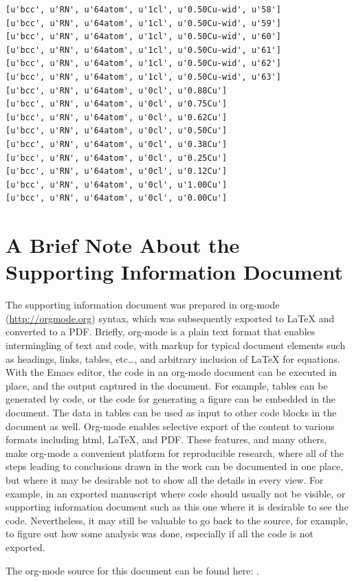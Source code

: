 \documentclass[number, sort&compress, review, 12pt]{elsarticle}
\begin{document}
\begin{verbatim}
[u'bcc', u'RN', u'64atom', u'1cl', u'0.50Cu-wid', u'58']
[u'bcc', u'RN', u'64atom', u'1cl', u'0.50Cu-wid', u'59']
[u'bcc', u'RN', u'64atom', u'1cl', u'0.50Cu-wid', u'60']
[u'bcc', u'RN', u'64atom', u'1cl', u'0.50Cu-wid', u'61']
[u'bcc', u'RN', u'64atom', u'1cl', u'0.50Cu-wid', u'62']
[u'bcc', u'RN', u'64atom', u'1cl', u'0.50Cu-wid', u'63']
[u'bcc', u'RN', u'64atom', u'0cl', u'0.88Cu']
[u'bcc', u'RN', u'64atom', u'0cl', u'0.75Cu']
[u'bcc', u'RN', u'64atom', u'0cl', u'0.62Cu']
[u'bcc', u'RN', u'64atom', u'0cl', u'0.50Cu']
[u'bcc', u'RN', u'64atom', u'0cl', u'0.38Cu']
[u'bcc', u'RN', u'64atom', u'0cl', u'0.25Cu']
[u'bcc', u'RN', u'64atom', u'0cl', u'0.12Cu']
[u'bcc', u'RN', u'64atom', u'0cl', u'1.00Cu']
[u'bcc', u'RN', u'64atom', u'0cl', u'0.00Cu']
\end{verbatim}

\section{A Brief Note About the Supporting Information Document}
\label{sec-2}
The supporting information document was prepared in org-mode (\url{http://orgmode.org}) syntax, which was subsequently exported to \LaTeX{} and converted to a PDF. Briefly, org-mode is a plain text format that enables intermingling of text and code, with markup for typical document elements such as headings, links, tables, etc\ldots{}, and arbitrary inclusion of \LaTeX{} for equations. With the Emacs editor, the code in an org-mode document can be executed in place, and the output captured in the document. For example, tables can be generated by code, or the code for generating a figure can be embedded in the document. The data in tables can be used as input to other code blocks in the document as well. Org-mode enables selective export of the content to various formats including html, \LaTeX{}, and PDF. These features, and many others, make org-mode a convenient platform for reproducible research, where all of the steps leading to conclusions drawn in the work can be documented in one place, but where it may be desirable not to show all the details in every view. For example, in an exported manuscript where code should usually not be visible, or supporting information document such as this one where it is desirable to see the code. Nevertheless, it may still be valuable to go back to the source, for example, to figure out how some analysis was done, especially if all the code is not exported.

The org-mode source for this document can be found here: .
\end{document}
